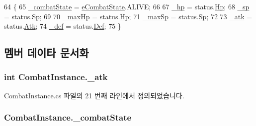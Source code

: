 \begin{DoxyCode}
64     \{
65         \hyperlink{class_combat_instance_a6352b66ef39484c9d76b03df56d26ee4}{\_combatState} = \hyperlink{_unit_object_8cs_ae6d9f4a8ae9fffcdf1a546168a44f917}{eCombatState}.ALIVE;
66 
67         \hyperlink{class_combat_instance_a392329b865aa88f2a579fcb7e7a0a99b}{\_hp} = status.\hyperlink{struct_status_a81b0c200ac8f8285e57cd4cc7bfd1fbf}{Hp};
68         \hyperlink{class_combat_instance_a3a9ee2ea52b19b5150386b52396621f9}{\_sp} = status.\hyperlink{struct_status_a71c109a2932f2f43a780485f6bf1209d}{Sp};
69 
70         \hyperlink{class_combat_instance_afce9395cdf3a359fb6eb982c0bf7f063}{\_maxHp} = status.\hyperlink{struct_status_a81b0c200ac8f8285e57cd4cc7bfd1fbf}{Hp};
71         \hyperlink{class_combat_instance_a2489b1182b81f028cfd45f26fb2a7af0}{\_maxSp} = status.\hyperlink{struct_status_a71c109a2932f2f43a780485f6bf1209d}{Sp};
72 
73         \hyperlink{class_combat_instance_a7107dad81ca2638ed2ad30de391029e6}{\_atk} = status.\hyperlink{struct_status_a60abcd71f2c5226ae8466b01b1fa56e6}{Atk};
74         \hyperlink{class_combat_instance_a1c2bc3e91c7e2fee8b5d5f489eaa3d40}{\_def} = status.\hyperlink{struct_status_a57d7e201d642441114f0426e449f6b45}{Def};
75     \}
\end{DoxyCode}


\subsection{멤버 데이타 문서화}
\subsubsection[{\texorpdfstring{\+\_\+atk}{_atk}}]{\setlength{\rightskip}{0pt plus 5cm}int Combat\+Instance.\+\_\+atk\hspace{0.3cm}{\ttfamily [private]}}\hypertarget{class_combat_instance_a7107dad81ca2638ed2ad30de391029e6}{}\label{class_combat_instance_a7107dad81ca2638ed2ad30de391029e6}


Combat\+Instance.\+cs 파일의 21 번째 라인에서 정의되었습니다.

\subsubsection[{\texorpdfstring{\+\_\+combat\+State}{_combatState}}]{ Combat\+Instance.\+\_\+combat\+State\hspace{0.3cm}{\ttfamily [private]}}\hypertarget{class_combat_instance_a6352b66ef39484c9d76b03df56d26ee4}{}\label{class_combat_instance_a6352b66ef39484c9d76b03df56d26ee4}


